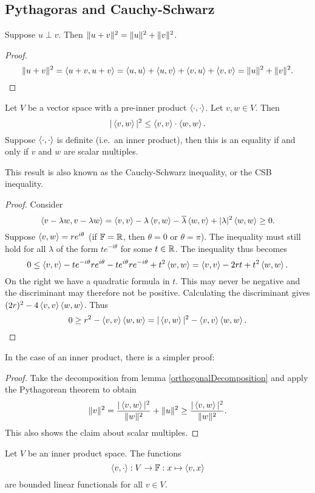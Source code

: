 \subsection{Pythagoras and Cauchy-Schwarz}
\begin{theorem} \label{Pythagoras}
Suppose $u\perp v$. Then $\lVert u+v\rVert^2 = \lVert u\rVert^2 + \lVert v\rVert^2$.
\end{theorem}
\begin{proof}
\[ \lVert u+v\rVert^2 = \left\langle u+v,u+v \right\rangle = \left\langle u,u \right\rangle+ \left\langle u,v \right\rangle + \left\langle v,u \right\rangle + \left\langle v,v \right\rangle = \lVert u\rVert^2 + \lVert v\rVert^2. \]
\end{proof}

\begin{theorem} \label{CauchySchwarz}
Let $V$ be a vector space with a pre-inner product $\left\langle \cdot,\cdot \right\rangle$. Let $v,w\in V$. Then
\[ |\left\langle v,w \right\rangle|^2\leq \left\langle v,v \right\rangle\cdot\left\langle w,w \right\rangle. \]
Suppose $\left\langle \cdot,\cdot \right\rangle$ is definite (i.e.\ an inner product), then
this is an equality \textup{if and only if} $v$ and $w$ are scalar multiples.
\end{theorem}
This result is also known as the Cauchy-Schwarz inequality, or the CSB inequality.
\begin{proof}
Consider 
\[ \left\langle v-\lambda w, v-\lambda w \right\rangle = \left\langle v,v \right\rangle-\lambda\left\langle v,w \right\rangle-\overline{\lambda}\left\langle w,v \right\rangle + |\lambda|^2 \left\langle w,w \right\rangle \geq 0. \]
Suppose $\left\langle v,w \right\rangle=re^{i\theta}$ (if $\mathbb{F} = \mathbb{R}$, then $\theta=0$ or $\theta = \pi$). The inequality must still hold for all $\lambda$ of the form $te^{-i\theta}$ for some $t\in \mathbb{R}$. The inequality thus becomes
\[ 0\leq \left\langle v,v \right\rangle-te^{-i\theta}re^{i\theta}-te^{i\theta}re^{-i\theta} + t^2 \left\langle w,w \right\rangle = \left\langle v,v \right\rangle-2rt + t^2 \left\langle w,w \right\rangle. \]
On the right we have a quadratic formula in $t$. This may never be negative and the discriminant may therefore not be positive. Calculating the discriminant gives $(2r)^2 - 4\left\langle v,v \right\rangle\left\langle w,w \right\rangle$. Thus
\[ 0\geq r^2 - \left\langle v,v \right\rangle\left\langle w,w \right\rangle = |\left\langle v,w \right\rangle|^2 - \left\langle v,v \right\rangle\left\langle w,w \right\rangle. \]
\end{proof}
In the case of an inner product, there is a simpler proof:
\begin{proof}
Take the decomposition from lemma \ref{orthogonalDecomposition} and apply the Pythagorean theorem to obtain
\[ \lVert v\rVert^2 = \frac{|\left\langle v,w \right\rangle|^2}{\lVert w\rVert^2} + \lVert u\rVert^2 \geq \frac{|\left\langle v,w \right\rangle|^2}{\lVert w\rVert^2}. \]
This also shows the claim about scalar multiples.
\end{proof}
\begin{corollary} \label{innerBoundedFunctionals}
Let $V$ be an inner product space. The functions
\[\left\langle v,\cdot \right\rangle: V\to \mathbb{F}: x\mapsto \left\langle v,x \right\rangle \]
are bounded linear functionals for all $v\in V$.
\end{corollary}
